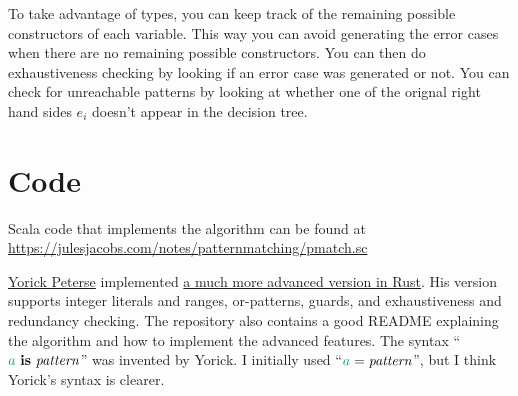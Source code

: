 \documentclass[a4paper, 11pt]{article}
\theoremstyle{definition}
\begin{document}
To take advantage of types, you can keep track of the remaining possible constructors of each variable. This way you can avoid generating the error cases when there are no remaining possible constructors. You can then do exhaustiveness checking by looking if an error case was generated or not. You can check for unreachable patterns by looking at whether one of the orignal right hand sides $e_i$ doesn't appear in the decision tree.

\section{Code}

Scala code that implements the algorithm can be found at \\ \url{https://julesjacobs.com/notes/patternmatching/pmatch.sc}

\medskip

\noindent
\href{https://yorickpeterse.com/}{Yorick Peterse} implemented \href{https://gitlab.com/yorickpeterse/pattern-matching-in-rust/-/tree/main/jacobs2021}{a much more advanced version in Rust}.
His version supports integer literals and ranges, or-patterns, guards, and exhaustiveness and redundancy checking.
The repository also contains a good README explaining the algorithm and how to implement the advanced features.
The syntax ``$\ba \is \patt$'' was invented by Yorick. I initially used ``$\ba = \patt$'', but I think Yorick's syntax is clearer.

\nocite{*}


\end{document}
